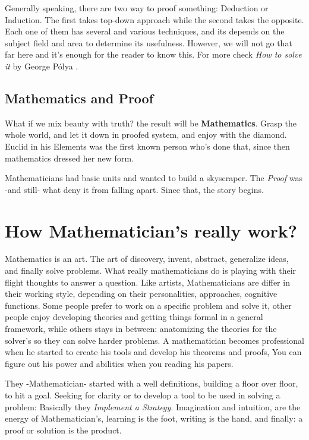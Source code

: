Generally speaking, there are two way to proof something: Deduction or Induction. The first takes top-down approach while the second takes the opposite. Each one of them has several and various techniques, and its depends on the subject field and area to determine its usefulness. However, we will not go that far here and it's enough for the reader to know this. For more check {\it How to solve it} by George Pólya \cite{polyasolve}.

\subsection{Mathematics and Proof}
What if we mix beauty with truth? the result will be {\bf Mathematics}. Grasp the whole world, and let it down in proofed system, and enjoy with the diamond. Euclid in his Elements\cite{euclid1956elements} was the first known person who's done that, since then mathematics dressed her new form.

Mathematicians had basic units and wanted to build a skyscraper. The {\it Proof} was -and still- what deny it from falling apart. Since that, the story begins.

\section{How Mathematician's really work?}\label{intro.work}
Mathematics is an art. The art of discovery, invent, abstract, generalize ideas, and finally solve problems. What really mathematicians do is playing with their flight thoughts to answer a question. Like artists, Mathematicians are  differ in their working style, depending on their personalities, approaches, cognitive functions. Some people prefer to work on a specific problem and solve it, other people enjoy developing theories and getting things formal in a general framework, while others stays in between: anatomizing the theories for the solver's so they can solve harder problems. A mathematician becomes professional when he started to create his tools and develop his theorems and proofs, You can figure out his power and abilities when you reading his papers.

They -Mathematician- started with a well definitions, building a floor over floor, to hit a goal. Seeking for clarity or to develop a tool to be used in solving a problem: Basically they {\it Implement a Strategy}. Imagination and intuition, are the energy of Mathematician's, learning is the foot, writing is the hand, and finally: a proof or solution is the product.

